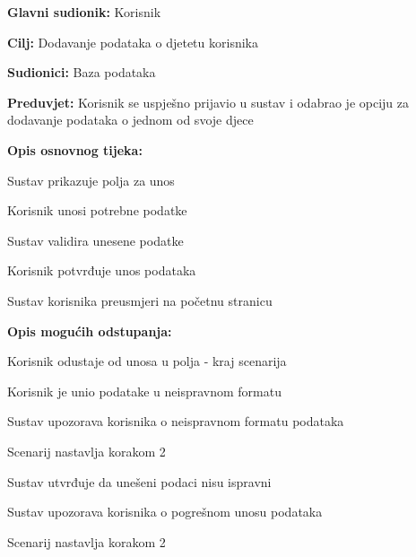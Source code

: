					\noindent {}
					\begin{packed_item}
	
						\item \textbf{Glavni sudionik: }Korisnik
						\item  \textbf{Cilj:} Dodavanje podataka o djetetu korisnika
						\item  \textbf{Sudionici:} Baza podataka
						\item  \textbf{Preduvjet:} Korisnik se uspješno prijavio u sustav i odabrao je opciju za dodavanje podataka o jednom od svoje djece
						\item  \textbf{Opis osnovnog tijeka:}
						
						\item[] \begin{packed_enum}
							\item Sustav prikazuje polja za unos
							\item Korisnik unosi potrebne podatke
							\item Sustav validira unesene podatke
							\item Korisnik potvrđuje unos podataka
							\item Sustav korisnika preusmjeri na početnu stranicu
						\end{packed_enum}

						\item  \textbf{Opis mogućih odstupanja:}

						\item[] \begin{packed_item}
							\item[2.a] Korisnik odustaje od unosa u polja - kraj scenarija
							\item[3.a] Korisnik je unio podatake u neispravnom formatu
							\item[] \begin{packed_enum}
								\item Sustav upozorava korisnika o neispravnom formatu podataka
								\item Scenarij nastavlja korakom 2 
							\end{packed_enum}	
							\item[5.a] Sustav utvrđuje da unešeni podaci nisu ispravni
							\item[] \begin{packed_enum}
								\item Sustav upozorava korisnika o pogrešnom unosu podataka
								\item Scenarij nastavlja korakom 2 
							\end{packed_enum}					
						\end{packed_item}
					\end{packed_item}	

